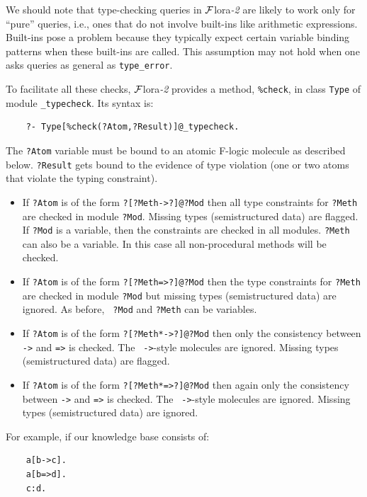 \documentclass[11pt]{article}
\newcommand{\FLORA}{{\mbox{\sc ${\cal F}${lora}\rm\emph{-2}}}\xspace}
\begin{document}
We should note that type-checking queries in \FLORA are likely to work only
for ``pure'' queries, i.e., ones that do not involve built-ins like
arithmetic expressions. Built-ins pose a problem because they typically
expect certain variable binding patterns when these built-ins are called.
This assumption may not hold when one asks queries as general as
{\tt type\_error}.

To facilitate all these checks, \FLORA provides a method, {\tt \%check},
in class {\tt Type} of module {\tt \_typecheck}.  Its syntax is:
\begin{verbatim}
    ?- Type[%check(?Atom,?Result)]@_typecheck.
\end{verbatim}
The {\tt ?Atom} variable must be bound to an atomic F-logic molecule as
described below. {\tt ?Result} gets bound to the evidence of type violation
(one or two atoms that violate the typing constraint).
\begin{itemize}
\item  If {\tt ?Atom} is of the form {\tt ?[?Meth->?]@?Mod} then all type
  constraints for {\tt ?Meth} are checked in module {\tt ?Mod}. Missing
  types (semistructured data) are flagged. If {\tt ?Mod} is a variable,
  then the constraints are checked in all modules.  {\tt ?Meth} can also be
  a variable. In this case all non-procedural methods will be checked.
\item If {\tt ?Atom} is of the form {\tt ?[?Meth=>?]@?Mod} then the type
  constraints for {\tt ?Meth} are checked in module {\tt ?Mod} but
  missing types (semistructured data) are ignored. As before, {\tt
    ?Mod} and {\tt ?Meth} can be variables.
\item  If {\tt ?Atom} is of the form {\tt ?[?Meth*->?]@?Mod} then only the
  consistency between {\tt *->} and {\tt *=>} is checked. The {\tt
    ->}-style molecules are ignored.   
  Missing types (semistructured data) are flagged.
\item If {\tt ?Atom} is of the form {\tt ?[?Meth*=>?]@?Mod} then again
  only the consistency between {\tt *->} and {\tt *=>} is checked. The {\tt
    ->}-style molecules are ignored.  Missing types (semistructured data)
  are ignored.
\end{itemize}
For example, if our knowledge base consists of:
\begin{verbatim}
    a[b->c].
    a[b=>d].
    c:d.
\end{verbatim}
\end{document}
